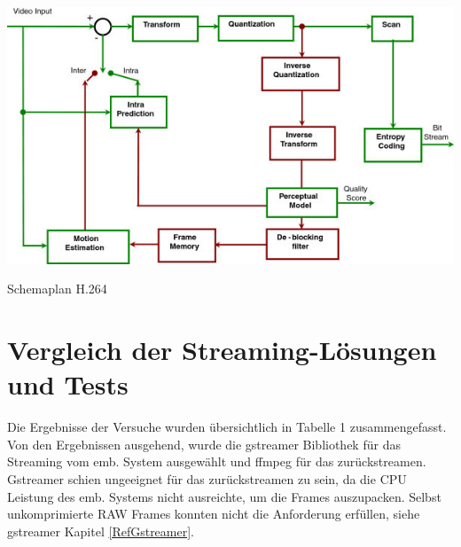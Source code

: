 \begin{minipage}{\textwidth}
    \begin{center}
        \includegraphics[scale=4.0]{img/h264.jpg} 
    \end{center}
\end{minipage}
\begin{center}
Schemaplan H.264
\end{center}

\section{Vergleich der Streaming-Lösungen und Tests} \label{RefVergleich}
Die Ergebnisse der Versuche wurden übersichtlich in Tabelle 1 zusammengefasst. Von den Ergebnissen ausgehend, wurde die gstreamer Bibliothek für das Streaming vom emb. System ausgewählt und ffmpeg für das zurückstreamen. Gstreamer schien ungeeignet für das zurückstreamen zu sein, da die CPU Leistung des emb. Systems nicht ausreichte, um die Frames auszupacken. Selbst unkomprimierte RAW Frames konnten nicht die Anforderung erfüllen, siehe gstreamer Kapitel \ref{RefGstreamer}.

